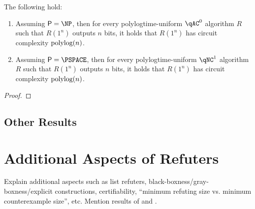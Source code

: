 \begin{lemma}
	\label{lem:acbinarytounary}
	The following hold:
	\begin{enumerate}
		\item Assuming $\PTIME = \NP$, then for every polylogtime-uniform $\qAC^0$ algorithm $R$
		such that $R(1^n)$ outputs $n$ bits, it holds that $R(1^n)$ has circuit complexity 
		$\text{polylog}(n)$.
		\item Assuming $\PTIME = \PSPACE$, then for every polylogtime-uniform $\qNC^1$ algorithm
		$R$ such that $R(1^n)$ outputs $n$ bits, it holds that $R(1^n)$ has circuit complexity 
		$\text{polylog}(n)$.
	\end{enumerate}
\end{lemma}

\begin{proof}

\end{proof}

\subsection{Other Results}


\section{Additional Aspects of Refuters}


Explain additional aspects such as list refuters, black-boxness/gray-boxness/explicit constructions, certifiability, ``minimum refuting size vs. minimum counterexample size'', etc.
Mention results of \cite{Atserias06} and \cite{Bogdanov10}. 

